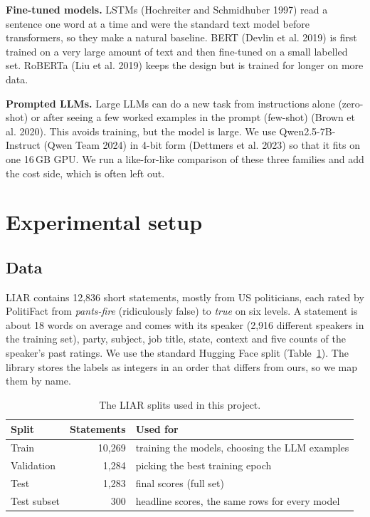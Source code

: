 \documentclass[10pt,a4paper,twoside]{article}
\begin{document}
\textbf{Fine-tuned models.} LSTMs (Hochreiter and Schmidhuber 1997) read a sentence one word at a time and were the standard text model before transformers, so they make a natural baseline. BERT (Devlin et al. 2019) is first trained on a very large amount of text and then fine-tuned on a small labelled set. RoBERTa (Liu et al. 2019) keeps the design but is trained for longer on more data.

\textbf{Prompted LLMs.} Large LLMs can do a new task from instructions alone (zero-shot) or after seeing a few worked examples in the prompt (few-shot) (Brown et al. 2020). This avoids training, but the model is large. We use Qwen2.5-7B-Instruct (Qwen Team 2024) in 4-bit form (Dettmers et al. 2023) so that it fits on one 16\,GB GPU. We run a like-for-like comparison of these three families and add the cost side, which is often left out.

\section{Experimental setup}

\subsection{Data}
LIAR contains 12,836 short statements, mostly from US politicians, each rated by PolitiFact from \emph{pants-fire} (ridiculously false) to \emph{true} on six levels. A statement is about 18 words on average and comes with its speaker (2,916 different speakers in the training set), party, subject, job title, state, context and five counts of the speaker's past ratings. We use the standard Hugging Face split (Table~\ref{tab:splits}). The library stores the labels as integers in an order that differs from ours, so we map them by name.

\begin{table}[H]
\centering\small
\caption{The LIAR splits used in this project.}
\label{tab:splits}
\begin{tabular}{lrl}
\toprule
Split & Statements & Used for \\
\midrule
Train & 10,269 & training the models, choosing the LLM examples \\
Validation & 1,284 & picking the best training epoch \\
Test & 1,283 & final scores (full set) \\
Test subset & 300 & headline scores, the same rows for every model \\
\bottomrule
\end{tabular}
\end{table}
\end{document}
